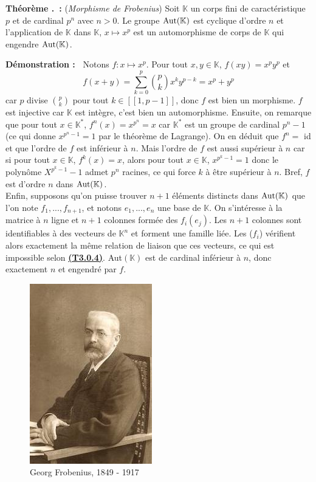 \documentclass[5pt,a4paper]{article}
\newcounter{thmcounter}[subsection]
\renewcommand{\thethmcounter}{\thesubsection.\arabic{thmcounter}}
\newcommand{\thm}[1]{
    \stepcounter{thmcounter}
    \hypertarget{t:\thethmcounter}{}%
    \noindent\textbf{Théorème \thethmcounter ~:} #1 \newline
}
\newcommand{\demo}[1]{
    \textbf{Démonstration :~} #1 \newline
}
\begin{document}
\begin{onehalfspacing}
\thm{(\textit{Morphisme de Frobenius}) Soit $\mathbb{K}$ un corps fini de caractéristique $p$ et de cardinal $p^n$ avec $n > 0$. Le groupe $\textup{Aut}(\mathbb{K})$ est cyclique d'ordre $n$ et l'application de $\mathbb{K}$ dans $\mathbb{K}$, $x \mapsto x^p$ est un automorphisme de corps de $\mathbb{K}$ qui engendre $\textup{Aut}(\mathbb{K})$.}
\demo{Notons $f : x \mapsto x^p$. Pour tout $x, y \in \mathbb{K}$, $f(xy) = x^py^p$ et 
\[f(x+y) = \displaystyle{\sum_{k=0}^{p}} \binom{p}{k}x^ky^{p-k} = x^p + y^p\] car $p$ divise $\binom{p}{k}$ pour tout $k \in [\![ 1, p-1]\!]$, donc $f$ est bien un morphisme. $f$ est injective car $\mathbb{K}$ est intègre, c'est bien un automorphisme. Ensuite, on remarque que pour tout $x \in \mathbb{K}^{*}$, $f^n(x) = x^{p^n} = x$ car $\mathbb{K}^{*}$ est un groupe de cardinal $p^n-1$ (ce qui donne $x^{p^n - 1} = 1$ par le théorème de Lagrange). On en déduit que $f^n =$ id et que l'ordre de $f$ est inférieur à $n$. Mais l'ordre de $f$ est aussi supérieur à $n$ car si pour tout $x \in \mathbb{K}$, $f^k(x) = x$, alors pour tout $x \in \mathbb{K}$, $x^{p^k - 1} = 1$ donc le polynôme $X^{p^k - 1} - 1$ admet $p^n$ racines, ce qui force $k$ à être supérieur à $n$. Bref, $f$ est d'ordre $n$ dans $\textup{Aut}(\mathbb{K})$. \\Enfin, supposons qu'on puisse trouver $n+1$ éléments distincts dans $\textup{Aut}(\mathbb{K})$ que l'on note $f_1, ..., f_{n+1}$, et notons $e_1, ..., e_n$ une base de $\mathbb{K}$. On s'intéresse à la matrice à $n$ ligne et $n+1$ colonnes formée des $f_i(e_j)$. Les $n+1$ colonnes sont identifiables à des vecteurs de $\mathbb{K}^n$ et forment une famille liée. Les ($f_i$) vérifient alors exactement la même relation de liaison que ces vecteurs, ce qui est impossible selon \hyperlink{t:3.0.4}{\textbf{(T3.0.4)}}. Aut$(\mathbb{K})$ est de cardinal inférieur à $n$, donc exactement $n$ et engendré par $f$.}

\begin{figure}[!h]
\centering
\includegraphics[width = 0.33\linewidth]{ressources/frobenius.jpg}
\caption{Georg Frobenius, 1849 - 1917}
\end{figure}



\end{onehalfspacing}
\end{document}
